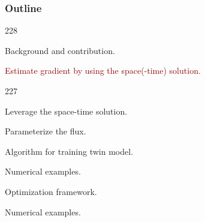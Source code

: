 \documentclass{beamer}
\newcommand{\barrow}{\item[\color{darkred}\ding{228}]}
\newcommand{\carrow}{\item[\color{darkred}\ding{227}]}
\begin{document}



\setcounter{framenumber}{6}
\begin{frame}
    \frametitle{Outline}\small
    \begin{dinglist}{228}
        \barrow {}Background and contribution.
        \barrow \textcolor{darkred}{Estimate gradient by using the space(-time) solution.}
        \begin{dinglist}{227}
            \carrow Leverage the space-time solution.
            \carrow Parameterize the flux.
            \carrow Algorithm for training twin model.
            \carrow Numerical examples.
        \end{dinglist}
        \barrow Optimization framework.
        \barrow Numerical examples.
    \end{dinglist}
\end{frame}
\end{document}
